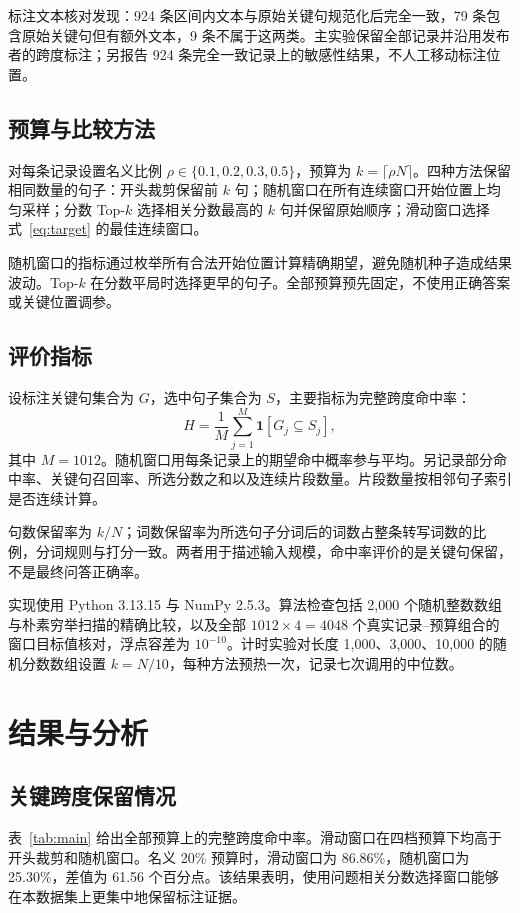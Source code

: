 \documentclass[10pt,journal,compsoc]{IEEEtran}
\begin{document}
标注文本核对发现：924 条区间内文本与原始关键句规范化后完全一致，79 条包含原始关键句但有额外文本，9 条不属于这两类。主实验保留全部记录并沿用发布者的跨度标注；另报告 924 条完全一致记录上的敏感性结果，不人工移动标注位置。

\subsection{预算与比较方法}
对每条记录设置名义比例 $\rho\in\{0.1,0.2,0.3,0.5\}$，预算为 $k=\lceil\rho N\rceil$。四种方法保留相同数量的句子：开头裁剪保留前 $k$ 句；随机窗口在所有连续窗口开始位置上均匀采样；分数 Top-$k$ 选择相关分数最高的 $k$ 句并保留原始顺序；滑动窗口选择式~\eqref{eq:target} 的最佳连续窗口。

随机窗口的指标通过枚举所有合法开始位置计算精确期望，避免随机种子造成结果波动。Top-$k$ 在分数平局时选择更早的句子。全部预算预先固定，不使用正确答案或关键位置调参。

\subsection{评价指标}
设标注关键句集合为 $G$，选中句子集合为 $S$，主要指标为完整跨度命中率：
\begin{equation}
 H=\frac{1}{M}\sum_{j=1}^{M}\mathbf{1}[G_j\subseteq S_j],
\end{equation}
其中 $M=1012$。随机窗口用每条记录上的期望命中概率参与平均。另记录部分命中率、关键句召回率、所选分数之和以及连续片段数量。片段数量按相邻句子索引是否连续计算。

句数保留率为 $k/N$；词数保留率为所选句子分词后的词数占整条转写词数的比例，分词规则与打分一致。两者用于描述输入规模，命中率评价的是关键句保留，不是最终问答正确率。

实现使用 Python 3.13.15 与 NumPy 2.5.3。算法检查包括 2,000 个随机整数数组与朴素穷举扫描的精确比较，以及全部 $1012\times4=4048$ 个真实记录--预算组合的窗口目标值核对，浮点容差为 $10^{-10}$。计时实验对长度 1,000、3,000、10,000 的随机分数数组设置 $k=N/10$，每种方法预热一次，记录七次调用的中位数。

\section{结果与分析}
\subsection{关键跨度保留情况}
表~\ref{tab:main} 给出全部预算上的完整跨度命中率。滑动窗口在四档预算下均高于开头裁剪和随机窗口。名义 20\% 预算时，滑动窗口为 86.86\%，随机窗口为 25.30\%，差值为 61.56 个百分点。该结果表明，使用问题相关分数选择窗口能够在本数据集上更集中地保留标注证据。
\end{document}
